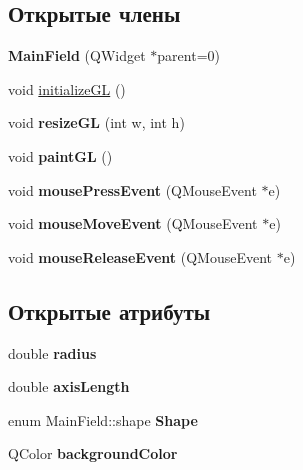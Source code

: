 \subsection*{Открытые члены}
\begin{DoxyCompactItemize}
\item 
\mbox{\label{class_main_field_a1472ec9c24eeccceb36d747399bde2a7}} 
{\bfseries Main\+Field} (Q\+Widget $\ast$parent=0)
\item 
void \mbox{\hyperlink{class_main_field_a9157bc4143c8251e3c591f36254c95dd}{initialize\+GL}} ()
\item 
\mbox{\label{class_main_field_ae743a6397ba68854dbd1770e42aaec40}} 
void {\bfseries resize\+GL} (int w, int h)
\item 
\mbox{\label{class_main_field_a9686ee0cd979a7f9e8debd4733d45b15}} 
void {\bfseries paint\+GL} ()
\item 
\mbox{\label{class_main_field_ad60631475e15b100be87942729ea3eed}} 
void {\bfseries mouse\+Press\+Event} (Q\+Mouse\+Event $\ast$e)
\item 
\mbox{\label{class_main_field_a966b56f3da47d5fd81573cf88f771f3c}} 
void {\bfseries mouse\+Move\+Event} (Q\+Mouse\+Event $\ast$e)
\item 
\mbox{\label{class_main_field_ac6771c491af27ecb7ec50eadfbfae852}} 
void {\bfseries mouse\+Release\+Event} (Q\+Mouse\+Event $\ast$e)
\end{DoxyCompactItemize}
\subsection*{Открытые атрибуты}
\begin{DoxyCompactItemize}
\item 
\mbox{\label{class_main_field_a2c998911cf8ddb87316d9d70ed2f7e2b}} 
double {\bfseries radius}
\item 
\mbox{\label{class_main_field_a4b199f4f27bc1ea69d22e259ba9685e3}} 
double {\bfseries axis\+Length}
\item 
\mbox{\label{class_main_field_a749ceb8cc017a8a4fb2180b6c84a49d0}} 
enum Main\+Field\+::shape {\bfseries Shape}
\item 
\mbox{\label{class_main_field_acfb46a2da2f3ba42c757801c5d5e9cea}} 
Q\+Color {\bfseries background\+Color}
\end{DoxyCompactItemize}
